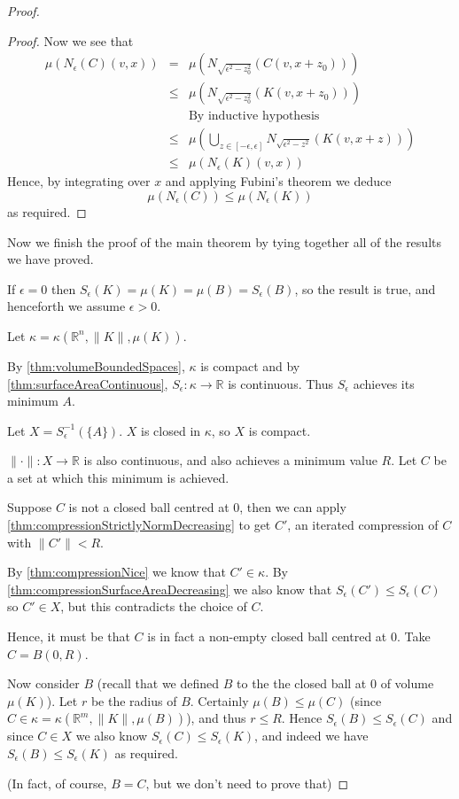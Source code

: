 \documentclass[a4paper,11pt]{article}
\newcommand{\bbR}{\mathbb{R}}
\newcommand{\lV}{\lVert}
\newcommand{\rV}{\rVert}
\begin{document}
\begin{proof}
\begin{proof}
Now we see that
%
\begin{eqnarray*}
\mu(N_\epsilon(C)(v,x))
&=& \mu\left(N_{\sqrt{\epsilon^2-z_0^2}}(C(v,x+z_0))\right) \\
&\leq& \mu\left(N_{\sqrt{\epsilon^2-z_0^2}}(K(v,x+z_0))\right) \\
&& \textrm{By inductive hypothesis} \\
&\leq& \mu\left(\bigcup_{z\in[-\epsilon,\epsilon]}
	N_{\sqrt{\epsilon^2-z^2}}(K(v,x+z))\right) \\
&\leq& \mu(N_\epsilon(K)(v,x))
\end{eqnarray*}
%
Hence, by integrating over $x$ and applying Fubini's theorem we deduce
\[
\mu(N_\epsilon(C))\leq\mu(N_\epsilon(K))
\]
as required.
\end{proof}

Now we finish the proof of the main theorem by tying together all of the
results we have proved.

If $\epsilon=0$ then $S_\epsilon(K)=\mu(K)=\mu(B)=S_\epsilon(B)$, so the result
is true, and henceforth we assume $\epsilon>0$.

Let $\kappa=\kappa(\bbR^n,\lV K\rV,\mu(K))$.

By \ref{thm:volumeBoundedSpaces}, $\kappa$ is compact and by
\ref{thm:surfaceAreaContinuous}, $S_\epsilon:\kappa\to\bbR$ is continuous.
Thus $S_\epsilon$ achieves its minimum $A$.

Let $X=S_\epsilon^{-1}(\{A\})$.  $X$ is closed in $\kappa$, so $X$ is compact.

$\lV\cdot\rV:X\to\bbR$ is also continuous, and also achieves a minimum value
$R$.  Let $C$ be a set at which this minimum is achieved.

Suppose $C$ is not a closed ball centred at $0$, then we can apply
\ref{thm:compressionStrictlyNormDecreasing} to get $C'$, an iterated
compression of $C$ with $\lV C'\rV<R$.

By \ref{thm:compressionNice} we know that $C'\in\kappa$.
By \ref{thm:compressionSurfaceAreaDecreasing} we also know that
$S_\epsilon(C')\leq S_\epsilon(C)$ so $C'\in X$, but this contradicts the
choice of $C$.

Hence, it must be that $C$ is in fact a non-empty closed ball centred at $0$.
Take $C=B(0,R)$.

Now consider $B$ (recall that we defined $B$ to the the closed ball at $0$ of
volume $\mu(K)$).  Let $r$ be the radius of $B$.  Certainly $\mu(B)\leq\mu(C)$
(since $C\in\kappa=\kappa(\bbR^m,\lV K\rV,\mu(B))$), and thus
$r\leq R$.  Hence $S_\epsilon(B)\leq S_\epsilon(C)$ and since $C\in X$ we also
know $S_\epsilon(C)\leq S_\epsilon(K)$, and indeed we have
$S_\epsilon(B)\leq S_\epsilon(K)$ as required.

(In fact, of course, $B=C$, but we don't need to prove that)
\end{proof}
\end{document}

